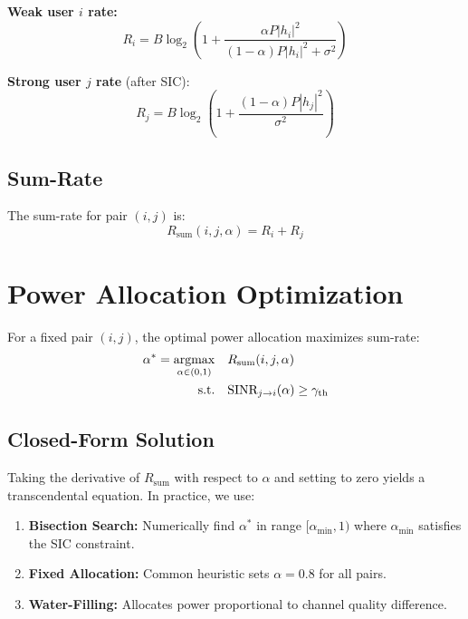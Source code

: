 \textbf{Weak user $i$ rate:}
\begin{equation}
R_i = B \log_2\left(1 + \frac{\alpha P |h_i|^2}{(1-\alpha) P |h_i|^2 + \sigma^2}\right)
\label{eq:rate_weak}
\end{equation}

\textbf{Strong user $j$ rate} (after SIC):
\begin{equation}
R_j = B \log_2\left(1 + \frac{(1-\alpha) P |h_j|^2}{\sigma^2}\right)
\label{eq:rate_strong}
\end{equation}

\subsection{Sum-Rate}

The sum-rate for pair $(i, j)$ is:
\begin{equation}
R_{\text{sum}}(i, j, \alpha) = R_i + R_j
\label{eq:sum_rate}
\end{equation}

\section{Power Allocation Optimization}

For a fixed pair $(i, j)$, the optimal power allocation maximizes sum-rate:
\begin{equation}
\begin{aligned}
\alpha^* = \operatorname*{argmax}_{\alpha \in (0,1)} \quad & R_{\text{sum}}(i, j, \alpha) \\
\text{s.t.} \quad & \text{SINR}_{j \to i}(\alpha) \geq \gamma_{\text{th}}
\end{aligned}
\label{eq:power_opt}
\end{equation}

\subsection{Closed-Form Solution}

Taking the derivative of $R_{\text{sum}}$ with respect to $\alpha$ and setting to zero yields a transcendental equation. In practice, we use:

\begin{enumerate}
    \item \textbf{Bisection Search:} Numerically find $\alpha^*$ in range $[\alpha_{\min}, 1)$ where $\alpha_{\min}$ satisfies the SIC constraint.
    
    \item \textbf{Fixed Allocation:} Common heuristic sets $\alpha = 0.8$ for all pairs.
    
    \item \textbf{Water-Filling:} Allocates power proportional to channel quality difference.
\end{enumerate}

